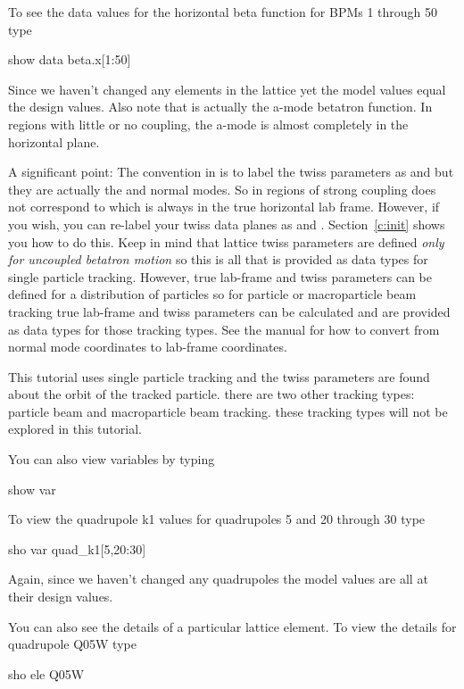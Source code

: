 To see the data values for the horizontal beta function for \cesr BPMs
1 through 50 type
\begin{example}
  show data beta.x[1:50]
\end{example}
Since we haven't changed any elements in the lattice yet the model
values equal the design values. Also note that  is actually
the a-mode betatron function. In regions with little or no coupling,
the a-mode is almost completely in the horizontal plane.

A significant point: The convention in \bmad is to label the twiss
parameters as  and  but they are actually the  and
 normal modes. So in regions of strong coupling  does
not correspond to  which is always in the true horizontal
lab frame.  However, if you wish, you can re-label your twiss data
planes as  and .  Section~\ref{c:init} shows you how to do
this. Keep in mind that lattice twiss parameters are defined
\textit{only for uncoupled betatron motion} so this is all that is
provided as data types for single particle tracking.  However, true
lab-frame  and  twiss parameters can be defined for a
distribution of particles so for particle or macroparticle beam
tracking true lab-frame  and  twiss parameters can be
calculated and are provided as data types for those tracking
types. See the \bmad manual for how to convert from normal mode
coordinates to lab-frame coordinates.

This tutorial uses single particle tracking and the twiss parameters
are found about the orbit of the tracked particle. there are two other
tracking types: particle beam and macroparticle beam tracking. these
tracking types will not be explored in this tutorial.

You can also view variables by typing
\begin{example}
  show var
\end{example}
To view the quadrupole k1 values for \cesr quadrupoles 5 and 20
through 30 type
\begin{example}
  sho var quad\_k1[5,20:30]
\end{example}
Again, since we haven't changed any quadrupoles the model values are
all at their design values.

You can also see the details of a particular lattice element. To view
the details for quadrupole Q05W type
\begin{example}
  sho ele Q05W
\end{example}

